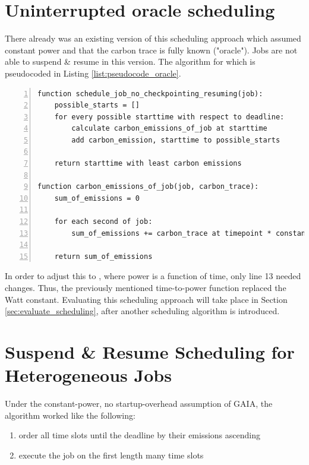 \section{Uninterrupted oracle scheduling} \label{sec:uninterrupted_oracle_scheduling}

There already was an existing version of this scheduling approach which assumed constant power and that the carbon trace is fully known ("oracle"). 
Jobs are not able to suspend \& resume in this version.
The algorithm for which is pseudocoded in Listing \ref{list:pseudocode_oracle}.

\begin{minipage}{\linewidth}
\begin{lstlisting}[frame=single, numbers=left, caption={Pseudocode for the original non-interrupt oracle scheduler}, label={list:pseudocode_oracle}, basicstyle=\ttfamily]
function schedule_job_no_checkpointing_resuming(job):
    possible_starts = []
    for every possible starttime with respect to deadline:
        calculate carbon_emissions_of_job at starttime
        add carbon_emission, starttime to possible_starts
    
    return starttime with least carbon emissions

function carbon_emissions_of_job(job, carbon_trace):
    sum_of_emissions = 0

    for each second of job:
        sum_of_emissions += carbon_trace at timepoint * constant_watt
    
    return sum_of_emissions
\end{lstlisting}
\end{minipage}

In order to adjust this to \modelname, where power is a function of time, only line 13 needed changes. 
Thus, the previously mentioned time-to-power function replaced the Watt constant.
Evaluating this scheduling approach will take place in Section \ref{sec:evaluate_scheduling}, after another scheduling algorithm is introduced.

\section{{Suspend \& Resume Scheduling for Heterogeneous Jobs}} \label{sec:checkpoint_resume_lp}

Under the constant-power, no startup-overhead assumption of GAIA, the algorithm worked like the following:

\begin{enumerate}
    \item order all time slots until the deadline by their emissions ascending
    \item execute the job on the first length many time slots
\end{enumerate}

